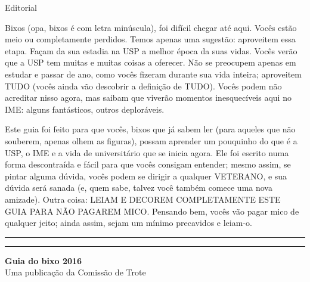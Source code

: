\begin{editorial}{Editorial}

Bixos (opa, bixos é com letra minúscula), foi difícil chegar até aqui. Vocês
estão meio ou completamente perdidos. Temos apenas uma sugestão: aproveitem essa
etapa.  Façam da sua estadia na USP a melhor época da suas vidas. Vocês verão
que a USP tem muitas e muitas coisas a oferecer. Não se preocupem apenas em
estudar e passar de ano, como vocês fizeram durante sua vida inteira; aproveitem
TUDO (vocês ainda vão descobrir a definição de TUDO). Vocês podem não acreditar
nisso agora, mas saibam que viverão momentos inesquecíveis aqui no IME: alguns
fantásticos, outros deploráveis.

Este guia foi feito para que vocês, bixos que já sabem ler (para aqueles que não
souberem, apenas olhem as figuras), possam aprender um pouquinho do que é a USP,
o IME e a vida de universitário que se inicia agora. Ele foi escrito numa forma
descontraída e fácil para que vocês consigam entender; mesmo assim, se pintar
alguma dúvida, vocês podem se dirigir a qualquer VETERANO, e sua dúvida será
sanada (e, quem sabe, talvez você também comece uma nova amizade). Outra coisa:
LEIAM E DECOREM COMPLETAMENTE ESTE GUIA PARA NÃO PAGAREM MICO. Pensando bem,
vocês vão pagar mico de qualquer jeito; ainda assim, sejam um mínimo precavidos
e leiam-o.


\rule{\textwidth}{0.5ex}\rule{2ex}{0.5ex}

{\large\bf Guia do bixo 2016} \\
Uma publicação da Comissão de Trote


\end{editorial}
